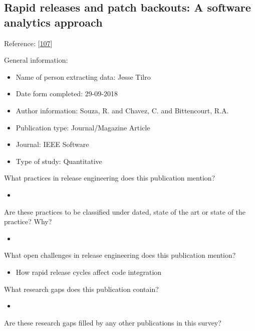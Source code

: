 \documentclass[]{book}
\providecommand{\tightlist}{%
  \setlength{\itemsep}{0pt}\setlength{\parskip}{0pt}}
\begin{document}
\subsection{Rapid releases and patch backouts: A software analytics
approach}\label{rapid-releases-and-patch-backouts-a-software-analytics-approach}

Reference: {[}\protect\hyperlink{ref-souza2015a}{107}{]}

General information:

\begin{itemize}
\tightlist
\item
  Name of person extracting data: Jesse Tilro
\item
  Date form completed: 29-09-2018
\item
  Author information: Souza, R. and Chavez, C. and Bittencourt, R.A.
\item
  Publication type: Journal/Magazine Article
\item
  Journal: IEEE Software
\item
  Type of study: Quantitative
\end{itemize}

What practices in release engineering does this publication mention?

\begin{itemize}
\item
\end{itemize}

Are these practices to be classified under dated, state of the art or
state of the practice? Why?

\begin{itemize}
\item
\end{itemize}

What open challenges in release engineering does this publication
mention?

\begin{itemize}
\tightlist
\item
  How rapid release cycles affect code integration
\end{itemize}

What research gaps does this publication contain?

\begin{itemize}
\item
\end{itemize}

Are these research gaps filled by any other publications in this survey?
\end{document}
